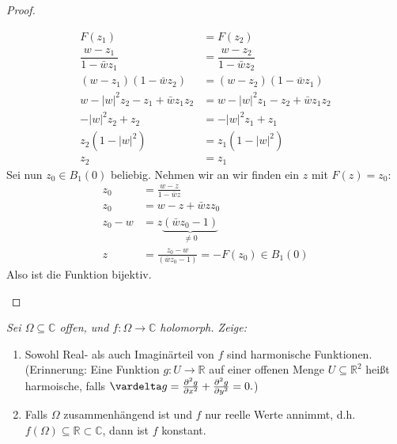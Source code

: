 \documentclass[11pt]{article}
\newcommand{\R}{\mathbb{R}}
\newcommand{\C}{\mathbb{C}}
\newenvironment{problem}[2][Beispiel]{
    \begin{trivlist}
        \item[\hskip \labelsep {\bfseries #1}\hskip \labelsep {\bfseries #2.}] \itshape}{
    \end{trivlist}\normalshape
}
\begin{document}
\begin{proof}
\begin{enumerate}[label=(\alph*)]
            $$\begin{aligned}
                  F(z_1) &= F(z_2)\\
                  \dfrac{w-z_1}{1-\bar{w}z_1} &= \dfrac{w-z_2}{1-\bar{w}z_2}\\
                  (w-z_1)(1-\bar{w}z_2) &= (w-z_2)(1-\bar{w}z_1)\\
                  w-|w|^{2}z_2-z_1+\bar{w}z_1z_2 &= w-|w|^{2}z_1-z_2+\bar{w}z_1z_2\\
                  -|w|^{2}z_2+z_2 &= -|w|^{2}z_1+z_1\\
                  z_2 (1-|w|^2) &= z_1 (1-|w|^2)\\
                  z_2&= z_1
            \end{aligned}$$
            Sei nun $z_0\in B_1(0)$ beliebig. Nehmen wir an wir finden ein $z$ mit
            $F(z) = z_0$:
            $$\begin{aligned}
                  z_0 &= \frac{w-z}{1-\bar{w}z}\\
                  z_0 &= w-z+\bar{w}zz_0\\
                  z_0 -w &= z \underbrace{(\bar{w}z_0 -1)}_{\neq 0}\\
                  z &= \frac{z_0 -w}{(\bar{w}z_0 -1)} = -F(z_0)\in B_1(0)
            \end{aligned}$$
            Also ist die Funktion bijektiv.
            
        \end{enumerate}
    \end{proof}

    \begin{problem}{4}
        Sei $\Omega\subseteq \C$ offen, und $f:\Omega \to \C$ holomorph. Zeige:
        \begin{enumerate}[label=(\alph*)]
            \item Sowohl Real- als auch Imaginärteil von $f$ sind harmonische
            Funktionen. \\(Erinnerung: Eine Funktion $g:U\to \R$ auf einer offenen
            Menge $U\subseteq \R^2$ heißt harmoische, falls $\vardelta g=
            \frac{\partial^2 g}{\partial x^2}+\frac{\partial^2 g}{\partial y^2}=0.$)
            \item Falls $\Omega$ zusammenhängend ist und $f$ nur reelle Werte annimmt,
            d.h. $f(\Omega)\subseteq \R\subset \C$, dann ist $f$ konstant.
        \end{enumerate}
    \end{problem}
\end{document}
